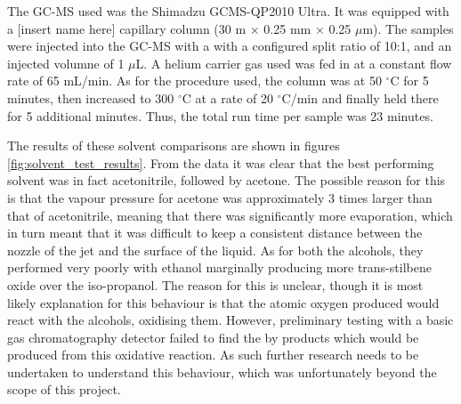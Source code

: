 The GC-MS used was the Shimadzu GCMS-QP2010 Ultra. It was equipped with a [insert name here] capillary column (30 m × 0.25 mm × 0.25 $\mu$m). The samples were injected into the GC-MS with a with a configured split ratio of 10:1, and an injected volumne of 1 $\mu$L. A helium carrier gas used was fed in at a constant flow rate of 65 mL/min. As for the procedure used, the column was at 50 $^{\circ}$C for 5 minutes, then increased to 300 $^{\circ}$C at a rate of 20 $^{\circ}$C/min and finally held there for 5 additional minutes. Thus, the total run time per sample was 23 minutes. 

The results of these solvent comparisons are shown in figures \ref{fig:solvent_test_results}. From the data it was clear that the best performing solvent was in fact acetonitrile, followed by acetone. The possible reason for this is that the vapour pressure for acetone was approximately 3 times larger than that of acetonitrile, meaning that there was significantly more evaporation, which in turn meant that it was difficult to keep a consistent distance between the nozzle of the jet and the surface of the liquid. As for both the alcohols, they performed very poorly with ethanol marginally producing more trans-stilbene oxide over the iso-propanol. The reason for this is unclear, though it is most likely explanation for this behaviour is that the atomic oxygen produced would react with the alcohols, oxidising them. However, preliminary testing with a basic gas chromatography detector failed to find the by products which would be produced from this oxidative reaction. As such further research needs to be undertaken to understand this behaviour, which was unfortunately beyond the scope of this project.

